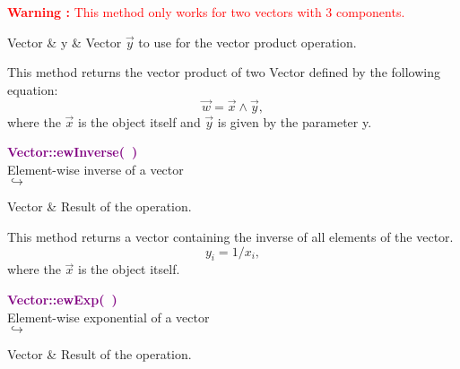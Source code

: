 \hspace*{10mm}\textcolor{red}{\textbf{Warning :} This method only works for two vectors with 3 components.}

\begin{tcolorbox}[width=\textwidth,myArgs,tabularx={ll|R}]
Vector & y & Vector $\overrightarrow{y}$ to use for the vector product operation.
\end{tcolorbox}

This method returns the vector product of two Vector defined by the following equation:
\begin{equation*}
\overrightarrow{w} = \overrightarrow{x}\land\overrightarrow{y},
\end{equation*}
where the $\overrightarrow{x}$ is the object itself and $\overrightarrow{y}$ is given by the parameter y.

\textcolor{purple}{\textbf{Vector::ewInverse(~)}}\label{Vector::ewInverse()}\\
Element-wise inverse of a vector\\ \hspace*{5mm}$\hookrightarrow$
\vspace*{-2em}\begin{tcolorbox}[grow to left by=-1cm, width=\textwidth-1cm,myArgs,tabularx={l|R}]
Vector & Result of the operation.
\end{tcolorbox}

This method returns a vector containing the inverse of all elements of the vector.
\begin{equation*}
y_i = 1/x_i,
\end{equation*}
where the $\overrightarrow{x}$ is the object itself.

\textcolor{purple}{\textbf{Vector::ewExp(~)}}\label{Vector::ewExp()}\\
Element-wise exponential of a vector\\ \hspace*{5mm}$\hookrightarrow$
\vspace*{-2em}\begin{tcolorbox}[grow to left by=-1cm, width=\textwidth-1cm,myArgs,tabularx={l|R}]
Vector & Result of the operation.
\end{tcolorbox}

